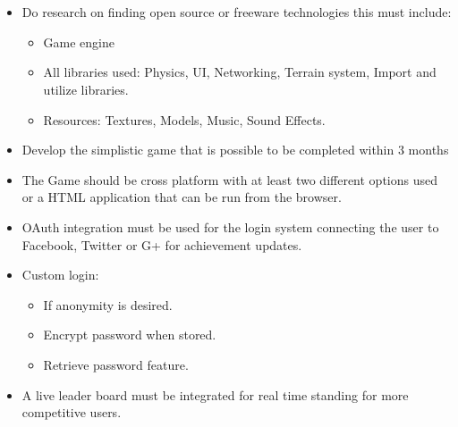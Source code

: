 \documentclass[letterpaper]{article}
\begin{document}
		\vspace{0.2in}
				
		\section*{\colorbox{blue}{}} 
		
		\vspace{0.2in}
		
		\begin{itemize}
			\item Do research on finding open source or freeware technologies this must include:
				\begin{itemize}
					\item	Game engine
					\item	All libraries used: Physics, UI, Networking, Terrain system, Import and utilize libraries.
					\item	Resources: Textures, Models, Music, Sound Effects.
				\end{itemize}
			\item	Develop the simplistic game that is possible to be completed within 3 months
			\item	The Game should be cross platform with at least two different options used or a HTML application that can be run from the browser.
			\item	OAuth integration must be used for the login system connecting the user to Facebook, Twitter or G+ for achievement updates.
			\item	Custom login: 
				\begin{itemize}
					\item	If anonymity is desired.
					\item	Encrypt password when stored.
					\item	Retrieve password feature.
				\end{itemize}
			\item	A live leader board must be integrated for real time standing for more competitive users.
		\end{itemize}
		
		\vspace{0.2in}
		
		\section*{\colorbox{blue}{}} 
		
\end{document}
